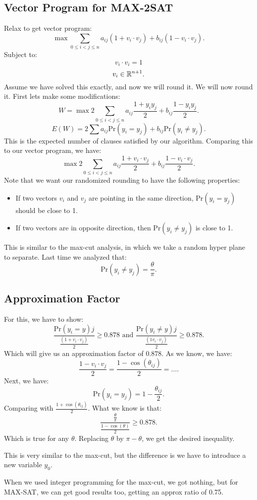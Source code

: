 \documentclass[../main/main.tex]{subfiles}
\begin{document}
\subsection{Vector Program for MAX-2SAT}
 Relax to get vector program: \[
	 \max \sum_{0\le i<j\le n}a_{ij}(1+v_i \cdot v_j)+b_{ij}(1-v_i\cdot v_j)
 .\] Subject to: \[
 v_i\cdot v_i=1
 \] \[
 v_i \in  \mathbb{R}^{n+1}
 .\] Assume we have solved this exactly, and now we will round it. We will now round it. First lets make some modifications: \[
 W=\max 2\sum_{0\le i<j\le n}a_{ij}\frac{1+y_iy_j}{2}+b_{ij}\frac{1-y_iy_j}{2}
 .\] \[
 E(W)=2\sum a_{ij}\text{Pr}(y_i=y_j)+b_{ij}\text{Pr}(y_i\neq y_j)
 .\] This is the expected number of clauses satisfied by our algorithm. Comparing this to our vector program, we have: \[
 \max 2 \sum_{0\le i<j\le n}a_{ij}\frac{1+v_i \cdot v_j}{2}+b_{ij}\frac{1-v_i\cdot v_j}{2}
 .\] Note that we want our randomized rounding to have the following properties: 
 \begin{itemize}
	 \item If two vectors $v_i$ and $v_j$ are pointing in the same direction, $\text{Pr}(y_i=y_j)$ should be close to 1.
	 \item If two vectors are in opposite direction, then $\text{Pr}(y_i\neq y_j)$ is close to 1.
 \end{itemize}
 This is similar to the max-cut analysis, in which we take a random hyper plane to separate. Last time we analyzed that: \[
	 \text{Pr}(y_i\neq y_j)= \frac{\theta}{\pi}
.\] 
\subsection{Approximation Factor}
For this, we have to show: \[
	\frac{\text{Pr}(y_i=y)j}{\frac{ \left( 1+v_i\cdot v_j \right) }{2} }\ge 0.878 \text{ and }
	\frac{\text{Pr}(y_i\neq y)j}{\frac{ \left( 1v_i\cdot v_j \right) }{2} }\ge 0.878
.\] Which will give us an approximation factor of $0.878$. As we know, we have:  \[
\frac{1-v_i\cdot v_j}{2}=\frac{1-\cos(\theta_{ij})}{2}= \ldots
.\] Next, we have: \[
\text{Pr}(y_i=y_j)=1-\frac{\theta_{ij}}{2}
.\] Comparing with $\frac{1+\cos(\theta_{ij})}{2}$. What we know is that: \[
\frac{\frac{\theta}{\pi}}{\frac{1-\cos(\theta)}{2}}\ge 0.878
.\] Which is true for any $\theta$. Replacing $\theta$ by $\pi-\theta$, we get the desired inequality.
\begin{remark}
	This is very similar to the max-cut, but the difference is we have to introduce a new variable $y_0$.
\end{remark}
\begin{remark}
	When we used integer programming for the max-cut, we got nothing, but for MAX-SAT, we can get good results too, getting an approx ratio of 0.75.
\end{remark}
\end{document}
